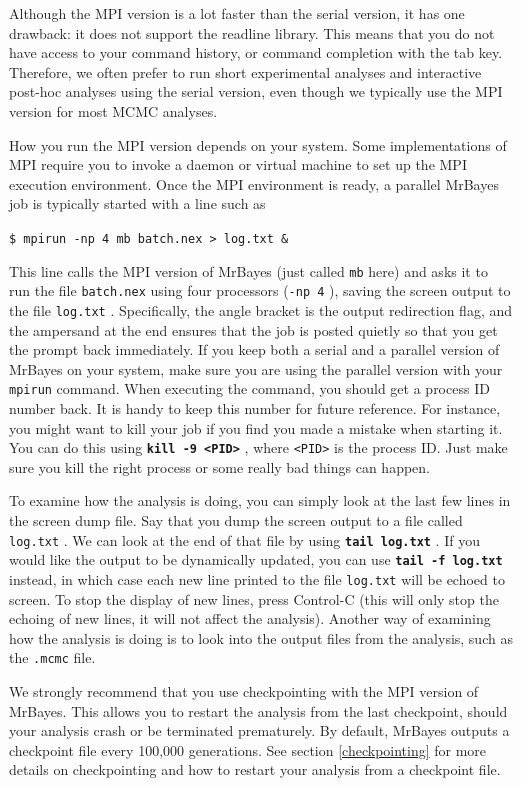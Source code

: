 \documentclass[12pt]{book}
\newcommand{\ttt}[1]{\texttt{#1} }
\newcommand{\tb}[1]{\texttt{\textbf{#1}} }
\begin{document}
Although the MPI version is a lot faster than the serial version, it has one drawback: it does not
support the readline library. This means that you do not have access to your command history, or
command completion with the tab key.  Therefore, we often prefer to run short experimental analyses
and interactive post-hoc analyses using the serial version, even though we typically use the MPI
version for most MCMC analyses.

How you run the MPI version depends on your system. Some implementations of MPI require you to
invoke a daemon or virtual machine to set up the MPI execution environment. Once the MPI
environment is ready, a parallel MrBayes job is typically started with a line such as

\ttt{\$ mpirun -np 4 mb batch.nex > log.txt \&}

This line calls the MPI version of MrBayes (just called \ttt{mb} here) and asks it to run the file
\ttt{batch.nex} using four processors (\ttt{-np 4}), saving the screen output to the file
\ttt{log.txt}. Specifically, the angle bracket is the output redirection flag, and the ampersand at
the end ensures that the job is posted quietly so that you get the prompt back immediately. If you
keep both a serial and a parallel version of MrBayes on your system, make sure you are using the
parallel version with your \ttt{mpirun} command.  When executing the command, you should get a
process ID number back. It is handy to keep this number for future reference. For instance, you
might want to kill your job if you find you made a mistake when starting it. You can do this using
\tb{kill -9 <PID>}, where \ttt{<PID>} is the process ID. Just make sure you kill the right process
or some really bad things can happen.

To examine how the analysis is doing, you can simply look at the last few lines in the screen dump
file.  Say that you dump the screen output to a file called \ttt{log.txt}. We can look at the end
of that file by using \tb{tail log.txt}. If you would like the output to be dynamically updated,
you can use \tb{tail -f log.txt} instead, in which case each new line printed to the file
\ttt{log.txt} will be echoed to screen. To stop the display of new lines, press Control-C (this
will only stop the echoing of new lines, it will not affect the analysis). Another way of examining
how the analysis is doing is to look into the output files from the analysis, such as the
\ttt{.mcmc} file.

We strongly recommend that you use checkpointing with the MPI version of MrBayes. This allows you
to restart the analysis from the last checkpoint, should your analysis crash or be terminated
prematurely.  By default, MrBayes outputs a checkpoint file every 100,000 generations. See section
\ref{checkpointing} for more details on checkpointing and how to restart your analysis from a
checkpoint file.
\end{document}
